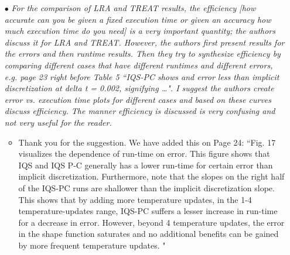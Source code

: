\documentclass[11pt]{letter}
\newcommand{\iqspc}{IQS-PC\xspace}
\newcommand{\done}{$\bullet$}
\newcommand{\medm}[1]{{\textit{#1}}}
\begin{document}
\begin{itemize}
Thank you for the recommendations. The following sentences have been added:
\begin{itemize}
\item Page 16: Added ``This result implies that uniqueness of the shape and amplitude can only be maintained with a consistent treatment of precursor term in the shape equation."
\item Page 18: Removed ``This illustrates that IQS can yield a much more accurate solution, even at a significantly larger time step than the implicit flux discretization."
\item Page 20: Added ``These convergence results are consistent with the hypothesis that the performance of IQS is highly dependent on the spatial coupling of the flux."
\item Page 20: Added ``This observation implies that the time adaptive options must be chosen differently when applied to a solver for shape versus a solver for flux."
\end{itemize}

\item[\done] \medm{ For the comparison of LRA and TREAT results, the efficiency [how accurate can you be given a fixed execution time or given an accuracy how much execution time do you need] is a very important quantity; the authors discuss it for LRA and TREAT. However, the authors first present results for the errors and then runtime results. Then they try to synthesize efficiency by comparing different cases that have different runtimes and different errors, e.g. page 23 right before Table 5 ``\iqspc shows and error less than implicit discretization at delta t = 0.002, signifying …". I suggest the authors create error vs. execution time plots for different cases and based on these curves discuss efficiency. The manner efficiency is discussed is very confusing and not very useful for the reader. }
\begin{itemize}
\item Thank you for the suggestion. We have added this on Page 24: ``Fig. 17 visualizes the dependence of run-time on error. This figure shows that IQS and IQS P-C generally has a lower run-time for certain error than implicit discretization. Furthermore, note that the slopes on the right half of the \iqspc runs are shallower than the implicit discretization slope. This shows that by adding more temperature updates, in the 1-4 temperature-updates range, \iqspc suffers a lesser increase in run-time for a decrease in error. However, beyond 4 temperature updates, the error in the shape function saturates and no additional benefits can be gained by more frequent temperature updates. "
\end{itemize}


\end{itemize}
\end{document}
